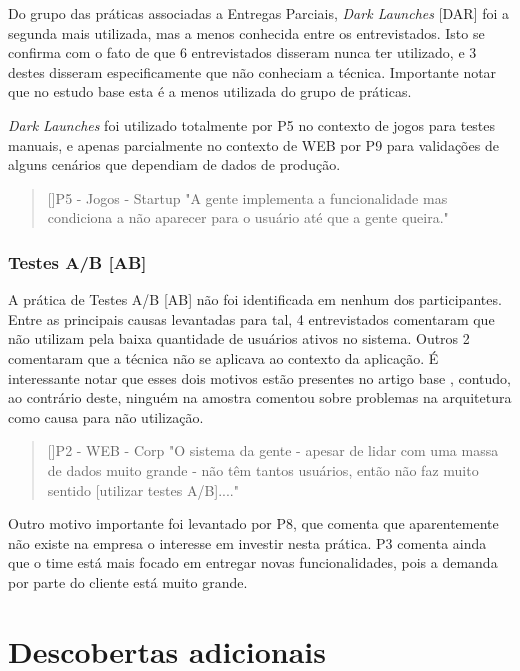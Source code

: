 Do grupo das práticas associadas a Entregas Parciais, \emph{Dark Launches} [DAR] foi a segunda mais utilizada, mas a menos conhecida entre os entrevistados. Isto se confirma com o fato de que 6 entrevistados disseram nunca ter utilizado, e 3 destes disseram especificamente que não conheciam a técnica. Importante notar que no estudo base \cite{empiricalStudy2016} esta é a menos utilizada do grupo de práticas.

\emph{Dark Launches} foi utilizado totalmente por P5 no contexto de jogos para testes manuais, e apenas parcialmente no contexto de WEB por P9 para validações de alguns cenários que dependiam de dados de produção.


\begin{quotation}[]{P5 - Jogos - Startup}
    "A gente implementa a funcionalidade mas condiciona a não aparecer para o usuário até que a gente queira."
\end{quotation}

\subsubsection{Testes A/B [AB]}

A prática de Testes A/B [AB] não foi identificada em nenhum dos participantes. Entre as principais causas levantadas para tal, 4 entrevistados comentaram que não utilizam pela baixa quantidade de usuários ativos no sistema. Outros 2 comentaram que a técnica não se aplicava ao contexto da aplicação. É interessante notar que esses dois motivos estão presentes no artigo base \cite{empiricalStudy2016}, contudo, ao contrário deste, ninguém na amostra comentou sobre problemas na arquitetura como causa para não utilização.


\begin{quotation}[]{P2 - WEB - Corp}
    "O sistema da gente - apesar de lidar com uma massa de dados muito grande - não têm tantos usuários, então não faz muito sentido [utilizar testes A/B]...."
\end{quotation}

Outro motivo importante foi levantado por P8, que comenta que aparentemente não existe na empresa o interesse em investir nesta prática. P3 comenta ainda que o time está mais focado em entregar novas funcionalidades, pois a demanda por parte do cliente está muito grande.

\section{Descobertas adicionais}

